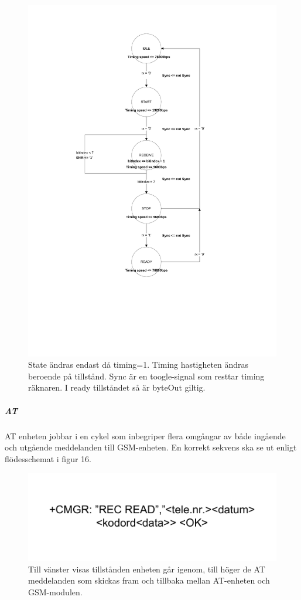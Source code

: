 \documentclass[a4paper]{scrartcl}
\begin{document}
		\begin{figure}[H]
			\centering
			\includegraphics[scale=0.6]{rxmachine.pdf}
			\caption{State ändras endast då timing=1. Timing hastigheten ändras beroende på tillstånd.  Sync är en toogle-signal som resttar timing räknaren. I ready tillståndet så är byteOut giltig.}
		\end{figure}

		\subparagraph{AT}
		AT enheten jobbar i en cykel som inbegriper flera omgångar av både ingående och utgående meddelanden till GSM-enheten. En korrekt sekvens ska se ut enligt flödesschemat i figur 16.
		\begin{figure}[H]
			\centering
			\includegraphics[scale=0.4]{atflow.pdf}
			\caption{Till vänster visas tillstånden enheten går igenom, till höger de AT meddelanden som skickas fram och tillbaka mellan AT-enheten och GSM-modulen.}
		\end{figure}
\end{document}

